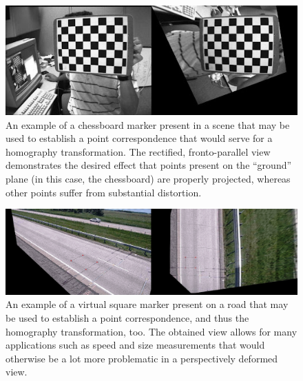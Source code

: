 \begin{figure}[t]
    \centerline{\includegraphics[width=\linewidth]{figures/homography/chessboard_marker.jpg}}
    \caption[Chessboard marker]{An example of a chessboard marker present in a scene that may be used to establish a point correspondence that would serve for a homography transformation. The rectified, fronto-parallel view demonstrates the desired effect that points present on the ``ground'' plane (in this case, the chessboard) are properly projected, whereas other points suffer from substantial distortion. }
    \label{fig:ChessboardMarker}
\end{figure}

\begin{figure}[t]
    \centerline{\includegraphics[width=\linewidth]{figures/homography/homography_road.png}}
    \caption[Square marker on a road]{An example of a virtual square marker present on a road that may be used to establish a point correspondence, and thus the homography transformation, too. The obtained view allows for many applications such as speed and size measurements that would otherwise be a lot more problematic in a perspectively deformed view. }
    \label{fig:RoadMarker}
\end{figure}

